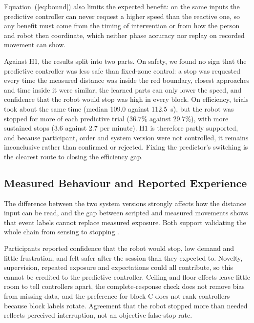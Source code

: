 \documentclass{IEEEtran}
\newcommand{\aidraft}[1]{#1}
\begin{document}
Equation~(\ref{eq:bound}) also limits the expected benefit: on the same inputs
the predictive controller can never request a higher speed than the reactive
one, so any benefit must come from the timing of intervention or from how the
person and robot then coordinate, which neither phase accuracy nor replay on
recorded movement can show.

\aidraft{Against H1, the results split into two parts. On safety, we found no
sign that the predictive controller was less safe than fixed-zone control: a
stop was requested every time the measured distance was inside the red
boundary, closest approaches and time inside it were similar, the learned
parts can only lower the speed, and confidence that the robot would stop was
high in every block. On efficiency, trials took about the same time (median
109.0 against 112.5~s), but the robot was stopped for more of each predictive
trial (36.7\% against 29.7\%), with more sustained stops (3.6 against 2.7 per
minute). H1 is therefore partly supported, and because participant, order and
system version were not controlled, it remains inconclusive rather than
confirmed or rejected. Fixing the predictor's switching is the clearest route
to closing the efficiency gap.}

\subsection{Measured Behaviour and Reported Experience}
The difference between the two system versions strongly affects how the
distance input can be read, and the gap between scripted and measured
movements shows that event labels cannot replace measured exposure. Both
support validating the whole chain from sensing to stopping
\cite{marvel2017implementing}.

Participants reported confidence that the robot would stop, low demand and
little frustration, and felt safer after the session than they expected to.
Novelty, supervision, repeated exposure and expectations could all contribute,
so this cannot be credited to the predictive controller. Ceiling and floor
effects leave little room to tell controllers apart, the complete-response
check does not remove bias from missing data, and the preference for block C
does not rank controllers because block labels rotate. Agreement that the
robot stopped more than needed reflects perceived interruption, not an
objective false-stop rate.
\end{document}
